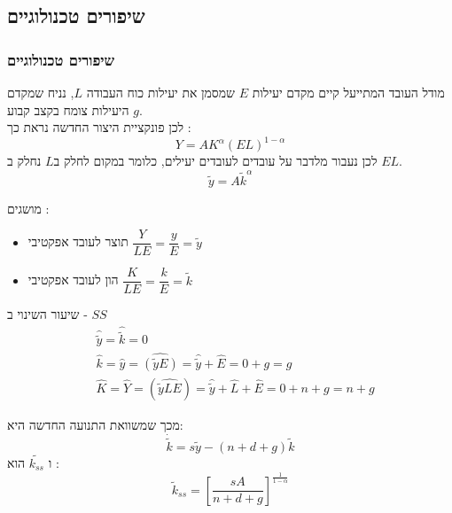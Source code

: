 \documentclass[usenames,dvipsnames,10pt]{beamer}
\begin{document}
\begin{RTL}
\section{שיפורים טכנולוגיים}

\begin{frame}[allowframebreaks]
    \frametitle{שיפורים טכנולוגיים}
    \begin{block}{מודל העובד המתייעל}
        קיים מקדם יעילות $E$ שמסמן את יעילות כוח העבודה $L$, נניח שמקדם היעילות צומח בקצב קבוע $g$. \\
        לכן פונקציית היצור החדשה נראת כך : 
        $$Y =  A K^{\alpha} \left(EL\right) ^ {1-\alpha}$$
        לכן נעבור מלדבר על עובדים לעובדים יעילים, כלומר במקום לחלק ב$L$ נחלק ב $EL$.
        $$\tilde{y} = A \tilde{k}^\alpha$$

    \end{block}
    מושגים : 
    \begin{itemize}
        \item תוצר לעובד אפקטיבי \quad $\dfrac{Y}{LE} = \dfrac{y}{E} = \tilde{y}$
        \item הון לעובד אפקטיבי \quad $\dfrac{K}{LE} = \dfrac{k}{E} = \tilde{k}$
    \end{itemize}


    \framebreak

    \begin{block}{שיעור השינוי ב - $SS$}
        \begin{equation*}
            \begin{aligned}
            & \hat{\tilde{y}}=\hat{\tilde{k}}=0 \\
            & \hat{k}=\hat{y}=\widehat{(\tilde{y} E)}=\hat{\tilde{y}}+\hat{E}=0+g=g \\
            & \widehat{K}=\hat{Y}=(\widehat{\tilde{y} L E})=\hat{\tilde{y}}+\hat{L}+\hat{E}=0+n+g=n+g
        \end{aligned}
        \end{equation*}
    \end{block}
    מכך שמשוואת התנועה החדשה היא:
    \begin{equation*}
        \dot{\tilde{k}}=s \tilde{y}-(n+d+g) \tilde{k}
    \end{equation*}
    ו $\tilde{k_{ss}}$ הוא : 
    \begin{equation*}
        \tilde{k}_{s s}=\left[\frac{s A}{n+d+g}\right]^{\frac{1}{1-\alpha}}
    \end{equation*}

    \framebreak


\end{frame}
\end{RTL}
\end{document}
